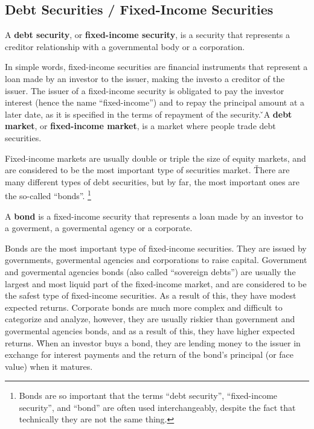 \subsection{Debt Securities / Fixed-Income Securities}

A \textbf{debt security}, or \textbf{fixed-income security}, is a security that represents a creditor relationship with
a governmental body or a corporation.
\ed

In simple words, fixed-income securities are financial instruments that represent a loan made by an investor to the
issuer, making the investo a creditor of the issuer. The issuer of a fixed-income security is obligated to pay the
investor interest (hence the name ``fixed-income'') and to repay the principal amount at a later date, as it is
specified in the terms of repayment of the security. \v

A \textbf{debt market}, or \textbf{fixed-income market}, is a market where people trade debt securities.
\ed

Fixed-income markets are usually double or triple the size of equity markets, and are considered to be the most
important type of securities market. \v

There are many different types of debt securities, but by far, the most important ones are the so-called ``bonds''.
\footnote{Bonds are so important that the terms ``debt security'', ``fixed-income security'', and ``bond'' are often
used interchangeably, despite the fact that technically they are not the same thing.}

\bd[Bond]
A \textbf{bond} is a fixed-income security that represents a loan made by an investor to a goverment, a govermental
agency or a corporate.
\ed

Bonds are the most important type of fixed-income securities. They are issued by governments, govermental agencies
and corporations to raise capital. Government and govermental agencies bonds (also called ``sovereign debts'') are
usually the largest and most liquid part of the fixed-income market, and are considered to be the safest type of
fixed-income securities. As a result of this, they have modest expected returns. Corporate bonds are much more complex
and difficult to categorize and analyze, however, they are usually riskier than government and govermental agencies
bonds, and as a result of this, they have higher expected returns. \v

When an investor buys a bond, they are lending money to the issuer in exchange for interest payments and the return of
the bond's principal (or face value) when it matures.

